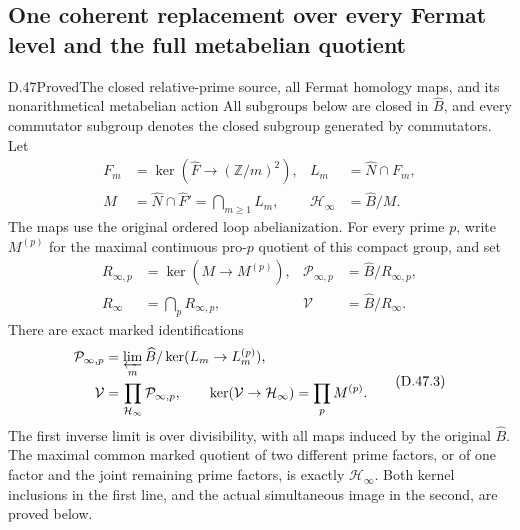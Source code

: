 \subsection{One coherent replacement over every Fermat level and the full metabelian quotient}

\begin{statement}{D.47}{Proved}{The closed relative-prime source, all Fermat homology maps, and its nonarithmetical metabelian action}
All subgroups below are closed in \(\widehat B\), and every
commutator subgroup denotes the closed subgroup generated
by commutators. Let
\[
 \begin{aligned}
 F_m&=\ker(\widehat F\to(\mathbb Z/m)^2),&
 L_m&=\widehat N\cap F_m,\\
 M&=\widehat N\cap\widehat F'
          =\bigcap_{m\ge1}L_m,&
 \mathcal H_\infty&=\widehat B/M .
 \end{aligned}                                                   \tag{D.47.1}
\]
The maps use the original ordered loop abelianization.
For every prime \(p\), write \(M^{(p)}\) for the maximal
continuous pro-\(p\) quotient of this compact group, and set
\[
 \begin{aligned}
 R_{\infty,p}&=\ker(M\to M^{(p)}),&
 \mathcal P_{\infty,p}&=\widehat B/R_{\infty,p},\\
 R_\infty&=\bigcap_pR_{\infty,p},&
 \mathcal V&=\widehat B/R_\infty .
 \end{aligned}                                                   \tag{D.47.2}
\]
There are exact marked identifications
\[
 \begin{aligned}
 \mathcal P_{\infty,p}
   &=\varprojlim_m
          \widehat B/\ker(L_m\to L_m^{(p)}),\\
 \mathcal V&=\prod_{\mathcal H_\infty}
                                     \mathcal P_{\infty,p},
       \qquad
 \ker(\mathcal V\to\mathcal H_\infty)
                         =\prod_pM^{(p)} .
 \end{aligned}                                                   \tag{D.47.3}
\]
The first inverse limit is over divisibility, with all maps
induced by the original \(\widehat B\). The maximal common
marked quotient of two different prime factors, or of one
factor and the joint remaining prime factors, is exactly
\(\mathcal H_\infty\). Both kernel inclusions in the first
line, and the actual simultaneous image in the second,
are proved below.


\end{statement}
